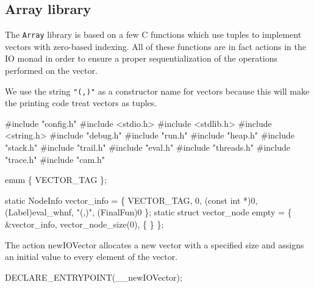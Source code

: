 %
%
\subsection{Array library}
The \texttt{Array} library is based on a few C functions which use
tuples to implement vectors with zero-based indexing. All of these
functions are in fact actions in the IO monad in order to ensure a
proper sequentialization of the operations performed on the vector.

We use the string \texttt{"(,)"} as a constructor name for vectors
because this will make the printing code treat vectors as tuples.

\nwenddocs{}\endmoddef\nwstartdeflinemarkup{}\nwenddeflinemarkup
#include "config.h"
#include <stdio.h>
#include <stdlib.h>
#include <string.h>
#include "debug.h"
#include "run.h"
#include "heap.h"
#include "stack.h"
#include "trail.h"
#include "eval.h"
#include "threads.h"
#include "trace.h"
#include "cam.h"

enum \{ VECTOR_TAG \};

static NodeInfo vector_info = \{
    VECTOR_TAG, 0, (const int *)0, (Label)eval_whnf, "(,)", (FinalFun)0
\};
static struct vector_node empty = \{
    &vector_info, vector_node_size(0), \{ \}
\};

\nwendcode{}\nwdocspar
The action {\Tt{}newIOVector\nwendquote} allocates a new vector with a specified
size and assigns an initial value to every element of the vector.

\nwenddocs{}\plusendmoddef\nwstartdeflinemarkup{}\nwenddeflinemarkup
DECLARE_ENTRYPOINT(__newIOVector);


